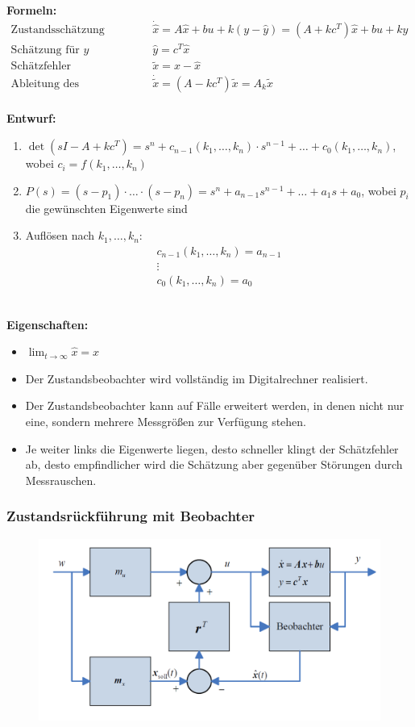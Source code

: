 \documentclass[10pt,a4paper]{article}
\newcommand{\tab}[1][1]{\hspace*{#1cm}}
\begin{document}
\textbf{Formeln:} ~\\
$
	\begin{array}{ll}
		\text{Zustandsschätzung} & \dot {\hat x} = A \hat x + bu + k(y - \hat y) = (A + kc^T)\hat x + bu + ky\\
		\text{Schätzung für }y & \hat y = c^T\hat x \\
		\text{Schätzfehler} & \tilde{x} = x - \hat x \\
		\text{Ableitung des Schätzfehlers} & \dot{\tilde x} = (A - kc^T)\tilde x = A_k \tilde x
	\end{array}
$ \\~\\

\textbf{Entwurf:}
\begin{enumerate}
	\item $\det(sI - A + kc^T) = s^n + c_{n-1}(k_1, \dots, k_n) ⋅ s^{n-1} + \dots + c_0(k_1, \dots, k_n)$, \tab wobei $c_i = f(k_1, \dots, k_n)$
	\item $P(s) = (s - p_1) ⋅ \dots ⋅ (s - p_n) = s^n + a_{n-1}s^{n - 1} + \dots + a_1s + a_0$, \tab wobei $p_i$ die gewünschten Eigenwerte sind
	\item Auflösen nach $k_1, \dots, k_n$: \\
	$$\begin{array}{c}
	c_{n-1}(k_1, \dots, k_n) = a_{n-1} \\
	\vdots \\
	c_0(k_1, \dots, k_n) = a_0
	\end{array}$$
\end{enumerate} ~\\

\textbf{Eigenschaften:}
\begin{itemize}
	\item $\lim_{t → ∞} \hat x = x$
	\item Der Zustandsbeobachter wird vollständig im Digitalrechner	realisiert.
	\item Der Zustandsbeobachter kann auf Fälle erweitert werden, in denen nicht nur eine, sondern mehrere Messgrößen zur Verfügung stehen.
	\item Je weiter links die Eigenwerte liegen, desto schneller klingt der Schätzfehler ab, desto empfindlicher wird die Schätzung aber gegenüber Störungen durch Messrauschen.
\end{itemize}

\subsubsection{Zustandsrückführung mit Beobachter}
\begin{figure}[H]
	\includegraphics[width=0.7\columnwidth]{imgs/abb7_13.png}
\end{figure}
\end{document}
